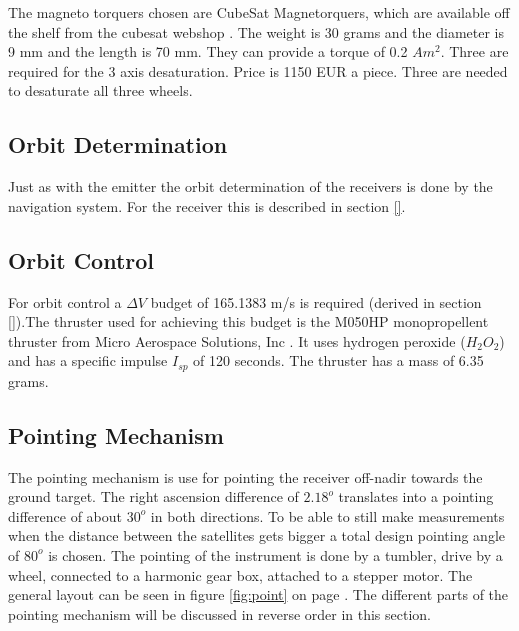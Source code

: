 The magneto torquers chosen are CubeSat Magnetorquers, which are available off the shelf from the cubesat webshop \cite{cubesatshop}. The weight is 30 grams and the diameter is 9 mm and the length is 70 mm. They can provide a torque of 0.2 $Am^2$. Three are required for the 3 axis desaturation. Price is 1150 EUR a piece. Three are needed to desaturate all three wheels.

\subsection{Orbit Determination}
\label{ss:recDDods}
Just as with the emitter the orbit determination of the receivers is done by the navigation system. For the receiver this is described in section \ref{}.

\subsection{Orbit Control}
\label{ss:recDDocs}
For orbit control a $\Delta V$ budget of 165.1383 m/s is required (derived in section \ref{}).The thruster used for achieving this budget is the M050HP monopropellent thruster from Micro Aerospace Solutions, Inc \cite{h2o2thruster}. It uses hydrogen peroxide ($H_2O_2$) and has a specific impulse $I_{sp}$ of 120 seconds. The thruster has a mass of 6.35 grams.

\subsection{Pointing Mechanism}
\label{ss:recDDpoint}
The pointing mechanism is use for pointing the receiver off-nadir towards the ground target. The right ascension difference of $2.18^o$ translates into a pointing difference of about $30^o$ in both directions. To be able to still make measurements when the distance between the satellites gets bigger a total design pointing angle of $80^o$ is chosen. The pointing of the instrument is done by a tumbler, drive by a wheel, connected to a harmonic gear box, attached to a stepper motor. The general layout can be seen in figure \ref{fig:point} on page \pageref{fig:point}. The different parts of the pointing mechanism will be discussed in reverse order in this section.

